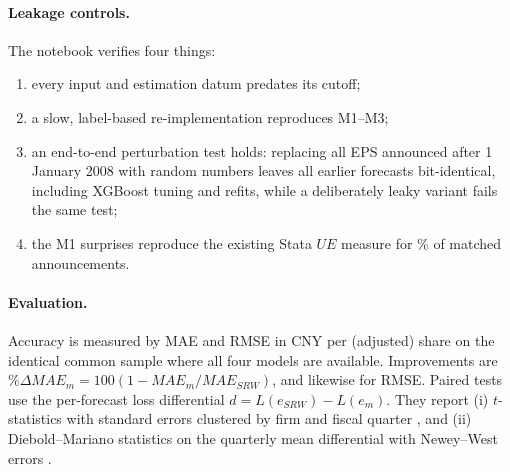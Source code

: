 \documentclass[11pt]{article}
\begin{document}
\paragraph{Leakage controls.} The notebook verifies four things:
\begin{enumerate}
\item every input and estimation datum predates its cutoff;
\item a slow, label-based re-implementation reproduces M1--M3;
\item an end-to-end perturbation test holds: replacing all EPS announced after 1 January 2008 with random numbers
leaves all \LookaheadN{} earlier forecasts bit-identical, including XGBoost tuning and refits, while a deliberately
leaky variant fails the same test;
\item the M1 surprises reproduce the existing Stata $UE$ measure for \XcheckPct\% of \XcheckN{} matched announcements.
\end{enumerate}

\paragraph{Evaluation.} Accuracy is measured by MAE and RMSE in CNY per (adjusted) share on the identical common sample
where all four models are available. Improvements are $\%\Delta MAE_m=100(1-MAE_m/MAE_{SRW})$, and likewise for RMSE.
Paired tests use the per-forecast loss differential $d=L(e_{SRW})-L(e_m)$. They report (i) $t$-statistics with
standard errors clustered by firm and fiscal quarter \citep{cameron2011,thompson2011}, and (ii) Diebold--Mariano
statistics on the quarterly mean differential with Newey--West errors \citep{diebold1995,newey1987}.

\begin{table}[!htbp]
\centering\small
\caption{Sample construction and model availability. Panel A: comparison period, FY2005Q1--FY2021Q1; M3's minimum
of eight Foster pairs is the binding requirement for the common sample. Panel B: all forecasts, with each model
forecasting as early as its own requirements allow; ``First forecast'' is the earliest target fiscal quarter with a
forecast. Percentages are relative to the targets of each panel.}
\label{tab:sample}

\end{table}
\end{document}
